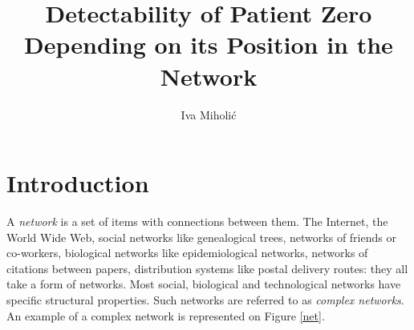 \documentclass[times, utf8, diplomski]{fer}
\begin{document}


\title{Detectability of Patient Zero Depending on its Position in the Network}

\author{Iva Miholić}

\maketitle

\izvornik

\zahvala{}

\tableofcontents
\listoffigures
\listofalgorithms

\chapter{Introduction}

A \emph{network} is a set of items with connections between them. The Internet, the World Wide Web, social networks like genealogical trees, networks of friends or co-workers, biological networks like epidemiological networks, networks of citations between papers, distribution systems like postal delivery routes: they all take a form of networks. Most social, biological and technological networks have specific structural properties. Such networks are referred to as \emph{complex networks}.  An example of a complex network is represented on Figure \ref{net}.
\end{document}

